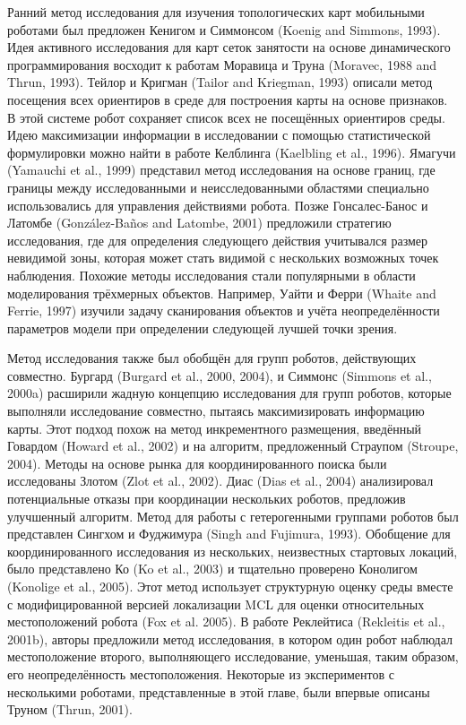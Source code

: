 \documentclass[10pt,a4paper]{article}
\begin{document}
Ранний метод исследования для изучения топологических карт мобильными роботами был предложен Кенигом и Симмонсом (Koenig and Simmons, 1993). Идея активного исследования для карт сеток занятости на основе динамического программирования восходит к работам Моравица и Труна (Moravec, 1988 and Thrun, 1993). Тейлор и Кригман (Tailor and Kriegman, 1993) описали метод посещения всех ориентиров в среде для построения карты на основе признаков. В этой системе робот сохраняет список всех не посещённых ориентиров среды. Идею максимизации информации в исследовании с помощью статистической формулировки можно найти в работе Келблинга (Kaelbling et al., 1996). Ямагучи (Yamauchi et al., 1999) представил метод исследования на основе границ, где границы между исследованными и неисследованными областями специально использовались для управления действиями робота. Позже Гонсалес-Банос и Латомбе (González-Baños and Latombe, 2001) предложили стратегию исследования, где для определения следующего действия учитывался размер невидимой зоны, которая может стать видимой с нескольких возможных точек наблюдения. Похожие методы исследования стали популярными в области моделирования трёхмерных объектов. Например, Уайти и Ферри (Whaite and Ferrie, 1997) изучили задачу сканирования объектов и учёта неопределённости параметров модели при определении следующей лучшей точки зрения.

Метод исследования также был обобщён для групп роботов, действующих совместно. Бургард (Burgard et al., 2000, 2004), и Симмонс (Simmons et al., 2000a) расширили жадную концепцию исследования для групп роботов, которые выполняли исследование совместно, пытаясь максимизировать информацию карты. Этот подход похож на метод инкрементного размещения, введённый Говардом (Howard et al., 2002) и на алгоритм, предложенный Страупом (Stroupe, 2004). Методы на основе рынка для координированного поиска были исследованы Злотом (Zlot et al., 2002). Диас (Dias et al., 2004) анализировал потенциальные отказы при координации нескольких роботов, предложив улучшенный алгоритм. Метод для работы с гетерогенными группами роботов был представлен Сингхом и Фуджимура (Singh and Fujimura, 1993). Обобщение для координированного исследования из нескольких, неизвестных стартовых локаций, было представлено Ко (Ko et al., 2003) и тщательно проверено Конолигом (Konolige et al., 2005). Этот метод использует структурную оценку среды вместе с модифицированной версией локализации MCL для оценки относительных местоположений робота (Fox et al. 2005). В работе Реклейтиса (Rekleitis et al., 2001b), авторы предложили метод исследования, в котором один робот наблюдал местоположение второго, выполняющего исследование, уменьшая, таким образом, его неопределённость местоположения. Некоторые из экспериментов с несколькими роботами, представленные в этой главе, были впервые описаны Труном (Thrun, 2001).\\
\end{document}
